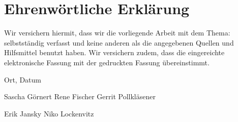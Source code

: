 
\clearpage
\chapter*{Ehrenwörtliche Erklärung}

Wir versichern hiermit, dass wir die vorliegende Arbeit
 mit dem Thema: \textit{\DerTitelDerArbeit} selbstständig verfasst und keine anderen als die angegebenen Quellen und
Hilfsmittel benutzt haben. Wir versichern zudem,
dass die eingereichte elektronische Fassung mit der gedruckten Fassung übereinstimmt.

\vspace{2cm}
Ort, Datum

\vspace{5mm}
Sascha Görnert
\hfill Rene Fischer
\hfill Gerrit Pollkläsener

\vspace{5mm}
\hfill Erik Jansky
\hfill Niko Lockenvitz
\hfill